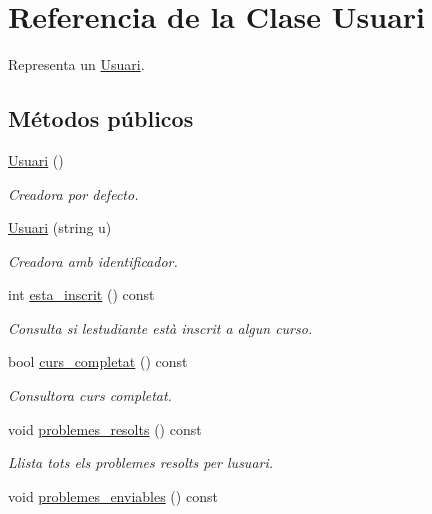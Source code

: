 \hypertarget{class_usuari}{}\section{Referencia de la Clase Usuari}
\label{class_usuari}


Representa un \mbox{\hyperlink{class_usuari}{Usuari}}.  


\subsection*{Métodos públicos}
\begin{DoxyCompactItemize}
\item 
\mbox{\hyperlink{class_usuari_ac6a1fbc3d6967c6de677580c60dfaaf4}{Usuari}} ()
\begin{DoxyCompactList}\small\item\em Creadora por defecto. \end{DoxyCompactList}\item 
\mbox{\hyperlink{class_usuari_a3e6c58812089cf0cf6ccd11d517d7ff3}{Usuari}} (string u)
\begin{DoxyCompactList}\small\item\em Creadora amb identificador. \end{DoxyCompactList}\item 
int \mbox{\hyperlink{class_usuari_a0d20c2d77d8231d9a7e3e00a42a7e7c8}{esta\+\_\+inscrit}} () const
\begin{DoxyCompactList}\small\item\em Consulta si l\textquotesingle{}estudiante està inscrit a algun curso. \end{DoxyCompactList}\item 
bool \mbox{\hyperlink{class_usuari_a3cb6bb4ab49c3f858f3588c77af11527}{curs\+\_\+completat}} () const
\begin{DoxyCompactList}\small\item\em Consultora curs completat. \end{DoxyCompactList}\item 
void \mbox{\hyperlink{class_usuari_a3ef9f5ec04fe13ecfaf6d2f02bcd30bd}{problemes\+\_\+resolts}} () const
\begin{DoxyCompactList}\small\item\em Llista tots els problemes resolts per l\textquotesingle{}usuari. \end{DoxyCompactList}\item 
void \mbox{\hyperlink{class_usuari_a84e0532f6b7ae4c4022e4739ca7abade}{problemes\+\_\+enviables}} () const

\end{DoxyCompactItemize}
